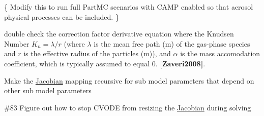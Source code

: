 
\begin{DoxyRefList}
\item[Module \mbox{\hyperlink{namespacecamp__camp__box__model__data}{camp\+\_\+camp\+\_\+box\+\_\+model\+\_\+data}} ]\label{todo__todo000001}%
%
\{ Modify this to run full Part\+MC scenarios with CAMP enabled so that aerosol physical processes can be included. \}  
\item[Member \mbox{\hyperlink{util_8h_af0918da54a73bf30e7079908caea2efd}{d\+\_\+transition\+\_\+regime\+\_\+correction\+\_\+factor\+\_\+d\+\_\+radius}} (double mean\+\_\+free\+\_\+path\+\_\+\+\_\+m, double radius\+\_\+\+\_\+m, double alpha)]\label{todo__todo000004}%
%
double check the correction factor derivative equation where the Knudsen Number $K_n = \lambda / r$ (where $\lambda$ is the mean free path (m) of the gas-\/phase species and $r$ is the effective radius of the particles (m)), and $ \alpha $ is the mass accomodation coefficient, which is typically assumed to equal 0. {\bfseries [Zaveri2008]}. 
\item[Member \mbox{\hyperlink{camp__solver_8h_a5b485fa25356197023889f3795888e98}{get\+\_\+jac\+\_\+init}} (\mbox{\hyperlink{struct_solver_data}{Solver\+Data}} $\ast$solver\+\_\+data)]\label{todo__todo000003}%
%
Make the \mbox{\hyperlink{struct_jacobian}{Jacobian}} mapping recursive for sub model parameters that depend on other sub model parameters  
\item[Member \mbox{\hyperlink{camp__solver_8h_a78e694c3221a39e0b96a5f40fa0fc0dd}{Jac}} (realtype t, N\+\_\+\+Vector y, N\+\_\+\+Vector deriv, SUNMatrix J, void $\ast$model\+\_\+data, N\+\_\+\+Vector tmp1, N\+\_\+\+Vector tmp2, N\+\_\+\+Vector tmp3)]\label{todo__todo000002}%
%
\#83 Figure out how to stop CVODE from resizing the \mbox{\hyperlink{struct_jacobian}{Jacobian}} during solving 
\end{DoxyRefList}